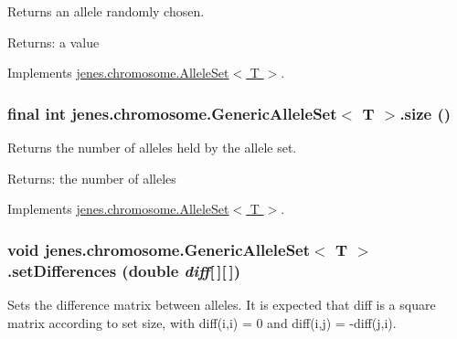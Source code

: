 Returns an allele randomly chosen.

\begin{Desc}
\item[Returns:]a value \end{Desc}


Implements \hyperlink{interfacejenes_1_1chromosome_1_1_allele_set_3_01_t_01_4_c09d409c55d941892df658d21b3d4bff}{jenes.chromosome.AlleleSet$<$ T $>$}.\hypertarget{classjenes_1_1chromosome_1_1_generic_allele_set_3_01_t_01_4_568ca617716496507d41e348c5bc2845}{
\subsubsection[size]{\setlength{\rightskip}{0pt plus 5cm}final int jenes.chromosome.GenericAlleleSet$<$ T $>$.size ()}}
\label{classjenes_1_1chromosome_1_1_generic_allele_set_3_01_t_01_4_568ca617716496507d41e348c5bc2845}


Returns the number of alleles held by the allele set.

\begin{Desc}
\item[Returns:]the number of alleles \end{Desc}


Implements \hyperlink{interfacejenes_1_1chromosome_1_1_allele_set_3_01_t_01_4_3acbb10df92ebafc589d5d8546949f2f}{jenes.chromosome.AlleleSet$<$ T $>$}.\hypertarget{classjenes_1_1chromosome_1_1_generic_allele_set_3_01_t_01_4_234b0a286a14fcaf0bf10894813465c5}{
\subsubsection[setDifferences]{\setlength{\rightskip}{0pt plus 5cm}void jenes.chromosome.GenericAlleleSet$<$ T $>$.setDifferences (double {\em diff}\mbox{[}$\,$\mbox{]}\mbox{[}$\,$\mbox{]})}}
\label{classjenes_1_1chromosome_1_1_generic_allele_set_3_01_t_01_4_234b0a286a14fcaf0bf10894813465c5}


Sets the difference matrix between alleles. It is expected that diff is a square matrix according to set size, with diff(i,i) = 0 and diff(i,j) = -diff(j,i).

